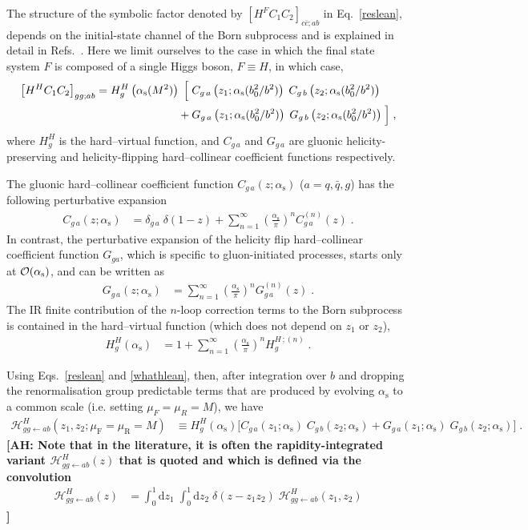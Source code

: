 \documentclass[12pt]{article}
\DeclareRobustCommand{\nn}{\nonumber}
\DeclareRobustCommand{\AH}[1]{\textbf{\quad\color{purple}[AH:\quad #1]}\xspace}
\DeclareRobustCommand{\alphas}{\ensuremath{\alpha_{\mathrm{s}}}\xspace}
\DeclareRobustCommand{\as}{\alphas}
\DeclareRobustCommand{\asOpi}{\ensuremath{\left(\frac{\as}{\pi}\right)}} %
\DeclareRobustCommand{\mur}{\ensuremath{\mu_{\mathrm{R}}}\xspace}
\DeclareRobustCommand{\muf}{\ensuremath{\mu_{\mathrm{F}}}\xspace}
\DeclareRobustCommand{\rd}{\ensuremath{\mathrm{d}}}
\DeclareRobustCommand{\cH}{\ensuremath{\mathcal{H}}}
\begin{document}
The structure of the symbolic factor denoted by $\left[ H^{F} C_1 C_2 \right]_{c\bar{c};a b}$ in Eq.~\eqref{reslean}, depends on the initial-state channel of the Born subprocess and is explained in detail in Refs.~\cite{Catani:2010pd,Catani:2013tia}. Here we limit ourselves to the case in which the final state system $F$ is composed of a single Higgs boson, $F\equiv H$, in which case,
\begin{align}
  \left[ H^{H} C_1 C_2 \right]_{gg;ab}
  = 
  H_{g}^{H}\left(\as(M^2)\right) \; \Bigl[ \; &
    C_{g \,a}\left(z_1;\as(b_0^2/b^2)\right) \; 
    C_{g \,b}\left(z_2;\as(b_0^2/b^2)\right) 
    \nn\\
    {}+{} & 
    G_{g \,a}\left(z_1;\as(b_0^2/b^2)\right) \; 
    G_{g \,b}\left(z_2;\as(b_0^2/b^2)\right)
  \;\Bigr]
  \;,
  \label{whathlean}
\end{align}
where $H_{g}^{H}$ is the hard--virtual function, and $C_{g \,a}$ and $G_{g \,a}$ are 
gluonic helicity-preserving and helicity-flipping hard--collinear coefficient functions respectively.

The gluonic hard--collinear coefficient function $C_{g \,a}(z;\as)$ ($a=q,{\bar q},g$) has the following perturbative expansion
\begin{align}
  C_{g \,a}(z;\as) &= 
  \delta_{g \,a} \; \delta(1-z) + 
  \sum_{n=1}^\infty \asOpi^n C_{g\, a}^{(n)}(z) \;.
  \label{cgexp} 
\end{align}
In contrast, the perturbative expansion of the helicity flip hard--collinear coefficient function $G_{ga}$, which is specific to gluon-initiated processes, starts only at ${\cal O}(\as)$, and can be written as~\cite{Catani:2010pd,Catani:2013tia}
\begin{align}
  G_{g \,a}(z;\as) &=
  \sum_{n=1}^\infty \asOpi^n G_{g \,a}^{(n)}(z) \;.
  \label{gfexp}
\end{align}
The IR finite contribution of the $n$-loop correction terms to the Born subprocess is contained in the hard--virtual function (which does not depend on $z_1$ or $z_2$),
\begin{align}
  H_g^{H}(\as) &= 
  1+ \sum_{n=1}^\infty \asOpi^n H_g^{H \,;(n)} \;.
  \label{hexp}
\end{align} 

Using Eqs.~\eqref{reslean} and \eqref{whathlean}, then, after integration over $b$ and dropping the renormalisation group predictable terms that are produced by evolving $\as$ to a common scale (i.e. setting $\mu_{F}=\mu_{R}=M$), we have 
\begin{align}
  \cH^H_{gg\gets ab}(z_1,z_2; \muf=\mur=M)
  &\equiv 
  H_g^H(\as) \Big[ 
    C_{g \,a}(z_1;\as) \; C_{g \,b}(z_2;\as) +
    G_{g \,a}(z_1;\as) \; G_{g \,b}(z_2;\as)
  \Big] \; .
  \label{HCCGG}
\end{align}
\AH{
Note that in the literature, it is often the rapidity-integrated variant $\cH^H_{gg\gets ab}(z)$ that is quoted and which is defined via the convolution
\begin{align}
  \cH^H_{gg\gets ab}(z)
  &=
  \int_0^1\rd z_1 \; \int_0^1\rd z_2 \; \delta(z-z_1 z_2) \; \cH^H_{gg\gets ab}(z_1,z_2)
\end{align}
}
\end{document}
